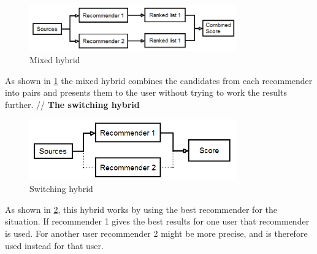 \begin{figure}[H]
\centering
\includegraphics[width=0.8\textwidth]{Images/Mixedhybrid.png}
\caption{Mixed hybrid}
\label{Mixed}
\end{figure}
As shown in \ref{Mixed} the mixed hybrid combines the candidates from each recommender into pairs and presents them to the user without trying to work the results further.
//
\textbf{The switching hybrid}

\begin{figure}[H]
\centering
\includegraphics[width=0.8\textwidth]{Images/Switchinghybrid.png}
\caption{Switching hybrid}
\label{Switching}
\end{figure}
As shown in \ref{Switching}, this hybrid works by using the best recommender for the situation. If recommender 1 gives the best results for one user that recommender is used. For another user recommender 2 might be more precise, and is therefore used instead for that user.

